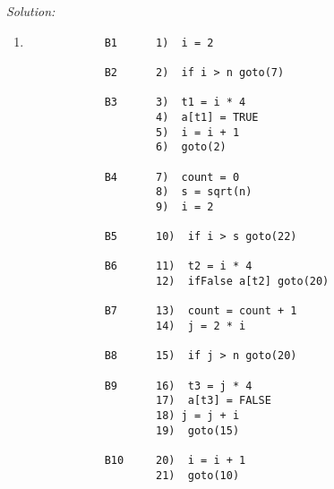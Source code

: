 \documentclass[a4paper, 11pt]{article}
\newenvironment{solution}
    {\textit{Solution:}}
    {}
\begin{document}
\begin{solution}
    \begin{enumerate}[a]
        \item \begin{verbatim}
            B1      1)  i = 2

            B2      2)  if i > n goto(7)

            B3      3)  t1 = i * 4
                    4)  a[t1] = TRUE
                    5)  i = i + 1
                    6)  goto(2)

            B4      7)  count = 0
                    8)  s = sqrt(n)
                    9)  i = 2
        
            B5      10)  if i > s goto(22)

            B6      11)  t2 = i * 4
                    12)  ifFalse a[t2] goto(20)

            B7      13)  count = count + 1
                    14)  j = 2 * i

            B8      15)  if j > n goto(20)

            B9      16)  t3 = j * 4
                    17)  a[t3] = FALSE
                    18) j = j + i
                    19)  goto(15)

            B10     20)  i = i + 1
                    21)  goto(10)
        \end{verbatim}


\end{enumerate}
\end{solution}
\end{document}
